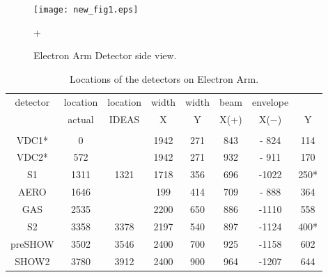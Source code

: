 \documentclass[12pt]{article}
\begin{document}
\begin{figure}
\begin{center}
\texttt{[image: new\_fig1.eps]}
{\linespread{1.}
\caption{Electron Arm Detector side view.}
\label{Electron_Arm_Detector_side_view}}
\end{center}+
\end{figure}
%
\begin{table}[hbtp]
\begin{center}
\caption{Locations of the detectors on Electron Arm.}
\medskip
\begin{tabular}{cccccccc}
detector&location&  location&  width &   width &    beam    & envelope &    \\
        & actual &   IDEAS  &   X    &     Y   &      X(+)  &  X($-$)&   Y   \\  \hline
       &        &           &        &         &            &        &       \\  \hline    
VDC1*   &      0 &          &   1942 &    271  &     843    & - 824  &  114  \\
VDC2*   &     572&          &   1942 &    271  &     932    & - 911  &  170  \\
S1      &    1311&     1321 &   1718 &    356  &     696    & -1022  &  250*  \\ 
AERO    &    1646&          &   199  &    414  &     709    & - 888  &  364  \\
GAS     &    2535&          &   2200 &    650  &     886    & -1110  &  558  \\ 
S2      &    3358&     3378 &   2197 &    540  &     897    & -1124  &  400* \\
preSHOW &    3502&     3546 &   2400 &    700  &     925    & -1158  &  602  \\ 
SHOW2   &    3780&     3912 &   2400 &    900  &     964    & -1207  &  644  \\  \hline

\end{tabular}
\end{center}
\end{table}
\end{document}
